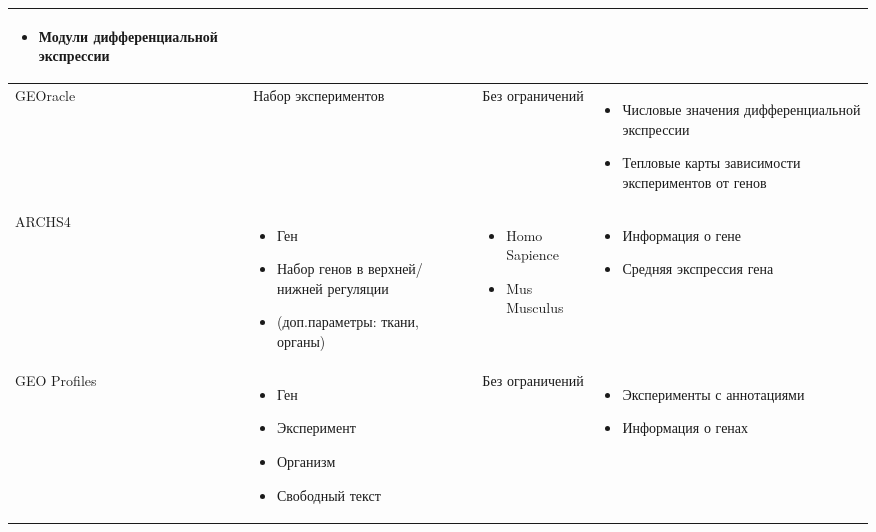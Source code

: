 \documentclass[times,specification,annotation]{itmo-student-thesis}
\begin{document}
\begin{table}
\begin{tabu}{ |X[l]|m{6.7cm}|m{6.7cm}|m{6.7cm}|}
\begin{itemize}
            \item Модули дифференциальной экспрессии
        \end{itemize}\\ 
        \hline 
         GEOracle & Набор экспериментов & Без ограничений & \begin{itemize}
            \item Числовые значения дифференциальной экспрессии
            \item Тепловые карты зависимости экспериментов от генов
        \end{itemize}\\ 
        \hline
         ARCHS4 & \begin{itemize}
            \item Ген
            \item Набор генов в верхней/нижней регуляции
            \item (доп.параметры: ткани, органы)
        \end{itemize} & \begin{itemize}
            \item Homo Sapience
            \item Mus Musculus
        \end{itemize} & \begin{itemize}
            \item Информация о гене
            \item Средняя экспрессия гена
        \end{itemize}\\ 
        \hline
         GEO Profiles & \begin{itemize}
            \item Ген
            \item Эксперимент
            \item Организм
            \item Свободный текст
        \end{itemize} & Без ограничений & \begin{itemize}
            \item Эксперименты с аннотациями
            \item Информация о генах
        \end{itemize}\\ 
        \hline
    \end{tabu}
\end{table}
\end{document}
